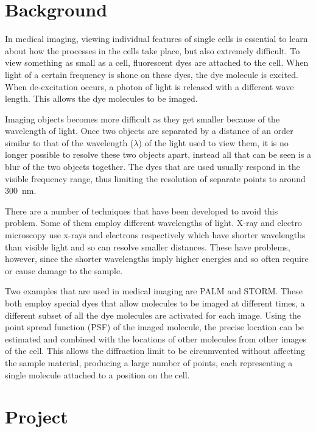 \section{Background}
\label{sec:background}

In medical imaging, viewing individual features of single cells is essential to
learn about how the processes in the cells take place, but also extremely
difficult. To view something as small as a cell, fluorescent dyes are attached
to the cell. When light of a certain frequency is shone on these dyes, the dye
molecule is excited. When de-excitation occurs, a photon of light is released
with a different wave length. This allows the dye molecules to be imaged.

Imaging objects becomes more difficult as they get smaller because of the
wavelength of light. Once two objects are separated by a distance of an order
similar to that of the wavelength ($\lambda$) of the light used to view them,
it is no longer possible to resolve these two objects apart, instead all that
can be seen is a blur of the two objects together. The dyes that are used
usually respond in the visible frequency range, thus limiting the resolution of
separate points to around \SI{300}{\nano\metre}.

There are a number of techniques that have been developed to avoid this
problem. Some of them employ different wavelengths of light. X-ray and electro
microscopy use x-rays and electrons respectively which have shorter wavelengths
than visible light and so can resolve smaller distances. These have problems,
however, since the shorter wavelengths imply higher energies and so often
require or cause damage to the sample.

Two examples that are used in medical imaging are PALM\cite{owen2010palm} and
STORM\cite{rust2006sub}. These both employ special dyes that allow molecules to
be imaged at different times, a different subset of all the dye molecules are
activated for each image. Using the point spread function (PSF) of the imaged
molecule, the precise location can be estimated and combined with the locations
of other molecules from other images of the cell. This allows the diffraction
limit to be circumvented without affecting the sample material, producing a
large number of points, each representing a single molecule attached to a
position on the cell.

\section{Project}
\label{sec:project}

